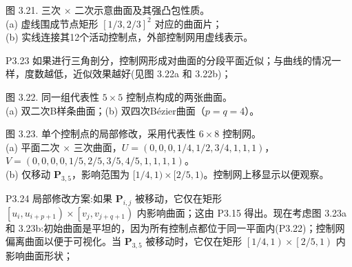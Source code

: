 \documentclass[../main.tex]{subfiles}
\begin{document}
\begin{center}
\begin{minipage}{18cm}
\vspace*{.6\baselineskip}
\centering
{}
\par\smallskip
图 3.21. 三次 \(\times\) 二次示意曲面及其强凸包性质。\\ (a) 虚线围成节点矩形 \([1/3,2/3]^2\) 对应的曲面片；\\ (b) 实线连接其12个活动控制点，外部控制网用虚线表示。
\end{minipage}
\end{center}



P3.23 如果进行三角剖分，控制网形成对曲面的分段平面近似；与曲线的情况一样，度数越低，近似效果越好(见图 3.22a 和 3.22b)；

\begin{center}
\begin{minipage}{18cm}
\vspace*{.6\baselineskip}
\centering
{}
\par\smallskip
图 3.22. 同一组代表性 \(5\times5\) 控制点构成的两张曲面。\\ (a) 双二次B样条曲面；(b) 双四次Bézier曲面（\(p=q=4\)）。
\end{minipage}
\end{center}



\begin{center}
\begin{minipage}{18cm}
\vspace*{.6\baselineskip}
\centering
{}
\par\smallskip
图 3.23. 单个控制点的局部修改，采用代表性 \(6\times8\) 控制网。\\ (a) 平面二次 \(\times\) 三次曲面，\(U=(0,0,0,1/4,1/2,3/4,1,1,1)\)，\\ \(V=(0,0,0,0,1/5,2/5,3/5,4/5,1,1,1,1)\)。\\ (b) 仅移动 \(\mathbf P_{3,5}\)，影响范围为 \([1/4,1)\times[2/5,1)\)。控制网上移显示以便观察。
\end{minipage}
\end{center}



P3.24 局部修改方案:如果 \({\mathbf{P}}_{i,j}\) 被移动，它仅在矩形 \(\left\lbrack  {{u}_{i},{u}_{i + p + 1}}\right)  \times  \left\lbrack  {{v}_{j},{v}_{j + q + 1}}\right)\) 内影响曲面；这由 P3.15 得出。现在考虑图 3.23a 和 3.23b:初始曲面是平坦的，因为所有控制点都位于同一平面内(P3.22)；控制网偏离曲面以便于可视化。当 \({\mathbf{P}}_{3,5}\) 被移动时，它仅在矩形 \(\left\lbrack  {1/4,1}\right)  \times  \left\lbrack  {2/5,1}\right)\) 内影响曲面形状；
\end{document}
